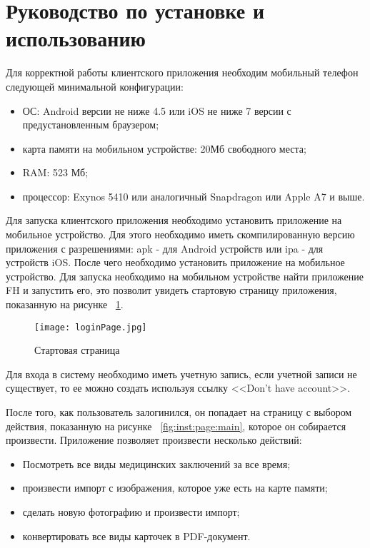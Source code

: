 \section{Руководство по установке и использованию}
\label{sec:inst}

Для корректной работы клиентского приложения необходим мобильный телефон следующей минимальной конфигурации:

\begin{itemize}
  \item ОС: Android версии не ниже 4.5 или iOS не ниже 7 версии с предустановленным браузером;
  \item карта памяти на мобильном устройстве: 20Мб свободного места;
  \item RAM: 523 Мб;
  \item процессор: Exynos 5410 или аналогичный Snapdragon или Apple A7 и выше.
\end{itemize}

Для запуска клиентского приложения необходимо установить приложение на мобильное устройство. Для этого необходимо иметь скомпилированную версию приложения с разрешениями: apk - для Android устройств или ipa - для устройств iOS. После чего необходимо установить приложение на мобильное устройство. Для запуска необходимо на мобильном устройстве найти приложение FH и запустить его, это позволит увидеть стартовую страницу приложения, показанную на рисунке ~\ref{fig:inst:page:login}.
\begin{figure}[ht]
\centering
  \texttt{[image: loginPage.jpg]}  
  \caption{ Стартовая страница }
  \label{fig:inst:page:login}
\end{figure}

Для входа в систему необходимо иметь учетную запись, если учетной записи не существует, то ее можно создать используя ссылку <<Don't have account>>.

После того, как пользователь залогинился, он попадает на страницу с выбором действия, показанную на рисунке ~\ref{fig:inst:page:main}, которое он собирается произвести. Приложение позволяет произвести несколько действий:
\begin{itemize}
  \item Посмотреть все виды медицинских заключений за все время;
  \item произвести импорт с изображения, которое уже есть на карте памяти;
  \item сделать новую фотографию и произвести импорт;
  \item конвертировать все виды карточек в PDF-документ.
\end{itemize}

